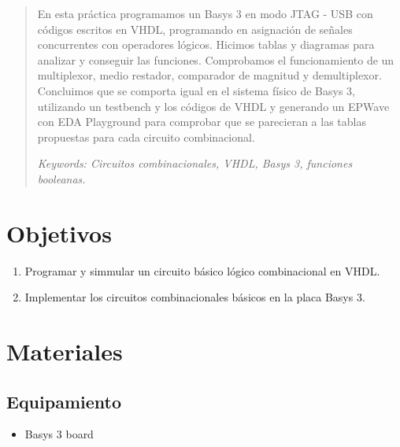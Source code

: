 \documentclass[12pt]{article}  %
\begin{document}
\setcounter{page}{1} %
\begin{abstract}
En esta práctica programamos un Basys 3 en modo JTAG - USB con códigos escritos en VHDL, programando en asignación de señales concurrentes con operadores lógicos. Hicimos tablas y diagramas para analizar y conseguir las funciones. Comprobamos el funcionamiento de un multiplexor, medio restador, comparador de magnitud y demultiplexor. Concluimos que se comporta igual en el sistema físico de Basys 3, utilizando un testbench y los códigos de VHDL y generando un EPWave con EDA Playground para comprobar que se parecieran a las tablas propuestas para cada circuito combinacional.

\vspace{0.5cm}

\textit{Keywords: Circuitos combinacionales, VHDL, Basys 3, funciones booleanas.}
\end{abstract}

\section*{Objetivos}

\begin{enumerate}
  \item Programar y simmular un circuito básico lógico combinacional en VHDL.
  \item Implementar los circuitos combinacionales básicos en la placa Basys 3.
\end{enumerate}

\section*{Materiales}

\subsection*{Equipamiento}

\begin{itemize}
    \item Basys 3 board
\end{itemize}
\end{document}
